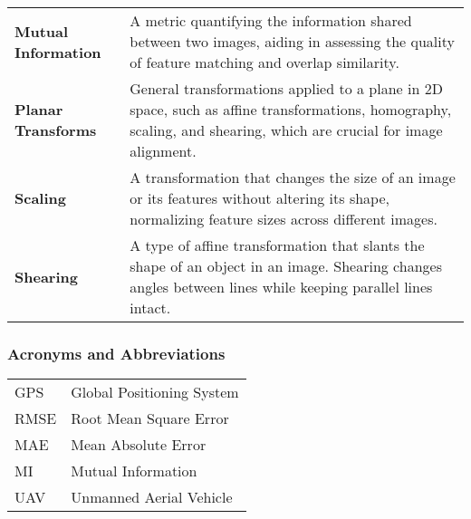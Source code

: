 \begin{tabularx}{\textwidth}{@{}p{2.5cm}L}
    \textbf{Mutual Information} & 
    A metric quantifying the information shared between two images, aiding in assessing the quality of feature matching and overlap similarity. \\

    \textbf{Planar Transforms} & 
    General transformations applied to a plane in 2D space, such as affine transformations, homography, scaling, and shearing, which are crucial for image alignment. \\

    \textbf{Scaling} & 
    A transformation that changes the size of an image or its features without altering its shape, normalizing feature sizes across different images. \\

    \textbf{Shearing} & 
    A type of affine transformation that slants the shape of an object in an image. Shearing changes angles between lines while keeping parallel lines intact. \\

\end{tabularx}
\endgroup

\newpage
\subsubsection*{Acronyms and Abbreviations}

\begingroup
\renewcommand{\arraystretch}{1.2}
\begin{tabular}{@{}p{2.5cm} l}
    GPS     & Global Positioning System \\
    RMSE    & Root Mean Square Error \\
    MAE     & Mean Absolute Error \\
    MI      & Mutual Information \\
    UAV     & Unmanned Aerial Vehicle \\
\end{tabular}
\endgroup
